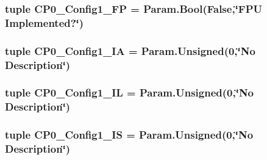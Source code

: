 \label{classMipsCPU_1_1BaseMipsCPU_a2025f5f700685399c54697216521338e}
\hypertarget{classMipsCPU_1_1BaseMipsCPU_a0fbf522dc1850880783779f272ee77f4}{
\subsubsection[{CP0\_\-Config1\_\-FP}]{\setlength{\rightskip}{0pt plus 5cm}tuple {\bf CP0\_\-Config1\_\-FP} = Param.Bool(False,\char`\"{}FPU Implemented?\char`\"{})}}
\label{classMipsCPU_1_1BaseMipsCPU_a0fbf522dc1850880783779f272ee77f4}
\hypertarget{classMipsCPU_1_1BaseMipsCPU_a8c1b4b0921d2ab939cb0bc96a08d65a7}{
\subsubsection[{CP0\_\-Config1\_\-IA}]{\setlength{\rightskip}{0pt plus 5cm}tuple {\bf CP0\_\-Config1\_\-IA} = Param.Unsigned(0,\char`\"{}No Description\char`\"{})}}
\label{classMipsCPU_1_1BaseMipsCPU_a8c1b4b0921d2ab939cb0bc96a08d65a7}
\hypertarget{classMipsCPU_1_1BaseMipsCPU_aaa196dbd7bde04f957ba2416824150ae}{
\subsubsection[{CP0\_\-Config1\_\-IL}]{\setlength{\rightskip}{0pt plus 5cm}tuple {\bf CP0\_\-Config1\_\-IL} = Param.Unsigned(0,\char`\"{}No Description\char`\"{})}}
\label{classMipsCPU_1_1BaseMipsCPU_aaa196dbd7bde04f957ba2416824150ae}
\hypertarget{classMipsCPU_1_1BaseMipsCPU_a471ff632ecf23727fcf1796c33a1a1dd}{
\subsubsection[{CP0\_\-Config1\_\-IS}]{\setlength{\rightskip}{0pt plus 5cm}tuple {\bf CP0\_\-Config1\_\-IS} = Param.Unsigned(0,\char`\"{}No Description\char`\"{})}}
